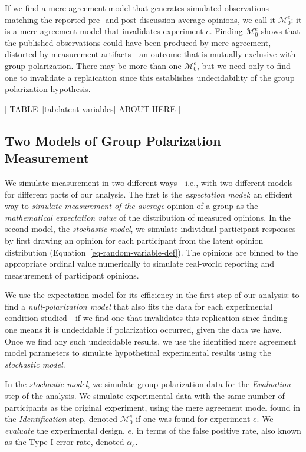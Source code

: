 \documentclass[preview]{article}
\newcommand{\nullmodel}{\mathcal{M}_0}
\begin{document}
If we find a mere agreement model that generates simulated observations
matching the reported pre- and post-discussion average opinions, we call it
$\nullmodel^e$: it is a mere agreement model that invalidates experiment
$e$.  Finding $\nullmodel^e$ shows that the published observations could
have been produced by mere agreement, distorted by measurement artifacts—an
outcome that is mutually exclusive with group polarization.
There may be more than one $\nullmodel^e$, but we need only to
find one to invalidate a replaication since this establishes undecidability
of the group polarization hypothesis.


\begin{center}
[  TABLE~\ref{tab:latent-variables} ABOUT HERE  ]
\end{center}


\subsection{Two Models of Group Polarization
Measurement}\label{two-models-of-group-polarization-measurement}

We simulate measurement in two different ways---i.e., with two different
models---for different parts of our analysis. The first is the
\emph{expectation model}: an efficient way to \emph{simulate measurement
of the average} opinion of a group as the
\emph{mathematical expectation value} of the distribution of measured
opinions. In the second model, the \emph{stochastic model},
we simulate individual participant responses by first drawing an opinion
for each participant from the latent opinion distribution
(Equation~\ref{eq-random-variable-def}). The opinions are binned to the
appropriate ordinal value numerically to simulate real-world reporting and
measurement of participant opinions.

We use the expectation model for its efficiency in the first step of our
analysis: to find a \emph{null-polarization model} that also fits the
data for each experimental condition studied---if we find one that
invalidates this replication since finding one means it is undecidable 
if polarization occurred, given the data we have. Once we find any such
undecidable results, we use the identified mere agreement model parameters to 
simulate hypothetical experimental results using the \emph{stochastic model}.

In the \emph{stochastic model}, we simulate group polarization data for
the \emph{Evaluation} step of the analysis. We simulate experimental
data with the same number of participants as the original experiment,
using the mere agreement model found in the \emph{Identification}
step, denoted $\nullmodel^e$ if one was found for experiment $e$.
We \emph{evaluate} the experimental design, $e$, in terms of the false
positive rate, also known as the Type I error rate, denoted $\alpha_e$. 
\end{document}
